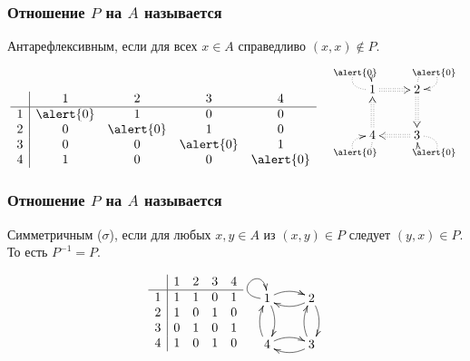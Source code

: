 \begin{frame}
    \frametitle{Отношение $P$ на $A$ называется}
    
    \begin{definition}
        \alert{Антарефлексивным}, если для всех $x\in A$ справедливо $(x,x)\not\in P$.
    \end{definition}
    \[  
        \begin{matrix}
            \begin{array}{c|cccc}
                 &1&2&3&4 \\ \hline
                1&\alert{0}&1&0&0 \\
                2&0&\alert{0}&1&0 \\
                3&0&0&\alert{0}&1 \\
                4&1&0&0&\alert{0}
            \end{array}
            &\raisebox{2\height}{
                {\xymatrix{
                    1 \ar@{.>}@(l,u)[]|{\alert{0}} \ar@{:>}[r]
                        &2 \ar@{.>}@(u,r)[]|{\alert{0}} \ar@{:>}[d]
                            \\
                    4 \ar@{.>}@(d,l)[]|{\alert{0}} \ar@{:>}[u]
                        &3 \ar@{.>}@(r,d)[]|{\alert{0}} \ar@{:>}[l]
                }}
            }
        \end{matrix}
    \]
\end{frame}

\begin{frame}
    \frametitle{Отношение $P$ на $A$ называется}
    
    \begin{definition}
        \alert{Симметричным ($\sigma$)}, если для любых $x,y\in A$ из $(x,y)\in P$ следует $(y,x)\in P$. То есть $P^{-1}=P$.
    \end{definition}
    \[  
        \begin{matrix}
            \begin{array}{c|cccc}
                 &1&2&3&4 \\ \hline
                1&1&1&0&1 \\
                2&1&0&1&0 \\
                3&0&1&0&1 \\
                4&1&0&1&0
            \end{array}
            &\raisebox{2\height}{
                {\xymatrix{
                    1 \ar@{->}@(l,u)[] \ar@{->}@/^/[r] \ar@{->}@/^/[d]
                        &2 \ar@{->}@/^/[d] \ar@{->}@/^/[l]
                            \\
                    4 \ar@{->}@/^/[u] \ar@{->}@/^/[r]
                        &3 \ar@{->}@/^/[l] \ar@{->}@/^/[u]
                }}
            }
        \end{matrix}
    \]
\end{frame}    

